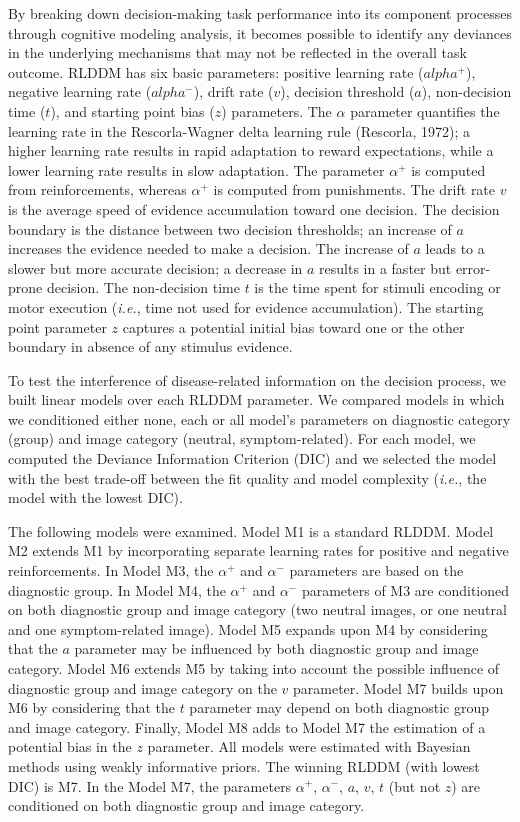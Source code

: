 \documentclass[
  man,floatsintext]{apa6}
\begin{document}
By breaking down decision-making task performance into its component processes through cognitive modeling analysis, it becomes possible to identify any deviances in the underlying mechanisms that may not be reflected in the overall task outcome. RLDDM has six basic parameters: positive learning rate (\(alpha^+\)), negative learning rate (\(alpha^-\)), drift rate (\(v\)), decision threshold (\(a\)), non-decision time (\(t\)), and starting point bias (\(z\)) parameters. The \(\alpha\) parameter quantifies the learning rate in the Rescorla-Wagner delta learning rule (Rescorla, 1972); a higher learning rate results in rapid adaptation to reward expectations, while a lower learning rate results in slow adaptation. The parameter \(\alpha^+\) is computed from reinforcements, whereas \(\alpha^+\) is computed from punishments. The drift rate \(v\) is the average speed of evidence accumulation toward one decision. The decision boundary is the distance between two decision thresholds; an increase of \(a\) increases the evidence needed to make a decision. The increase of \(a\) leads to a slower but more accurate decision; a decrease in \(a\) results in a faster but error-prone decision. The non-decision time \(t\) is the time spent for stimuli encoding or motor execution (\emph{i.e.}, time not used for evidence accumulation). The starting point parameter \(z\) captures a potential initial bias toward one or the other boundary in absence of any stimulus evidence.

To test the interference of disease-related information on the decision process, we built linear models over each RLDDM parameter. We compared models in which we conditioned either none, each or all model's parameters on diagnostic category (group) and image category (neutral, symptom-related). For each model, we computed the Deviance Information Criterion (DIC) and we selected the model with the best trade-off between the fit quality and model complexity (\emph{i.e.}, the model with the lowest DIC).

The following models were examined. Model M1 is a standard RLDDM. Model M2 extends M1 by incorporating separate learning rates for positive and negative reinforcements. In Model M3, the \(\alpha^+\) and \(\alpha^-\) parameters are based on the diagnostic group. In Model M4, the \(\alpha^+\) and \(\alpha^-\) parameters of M3 are conditioned on both diagnostic group and image category (two neutral images, or one neutral and one symptom-related image). Model M5 expands upon M4 by considering that the \(a\) parameter may be influenced by both diagnostic group and image category. Model M6 extends M5 by taking into account the possible influence of diagnostic group and image category on the \(v\) parameter. Model M7 builds upon M6 by considering that the \(t\) parameter may depend on both diagnostic group and image category. Finally, Model M8 adds to Model M7 the estimation of a potential bias in the \(z\) parameter. All models were estimated with Bayesian methods using weakly informative priors. The winning RLDDM (with lowest DIC) is M7. In the Model M7, the parameters \(\alpha^+\), \(\alpha^-\), \(a\), \(v\), \(t\) (but not \(z\)) are conditioned on both diagnostic group and image category.
\end{document}
